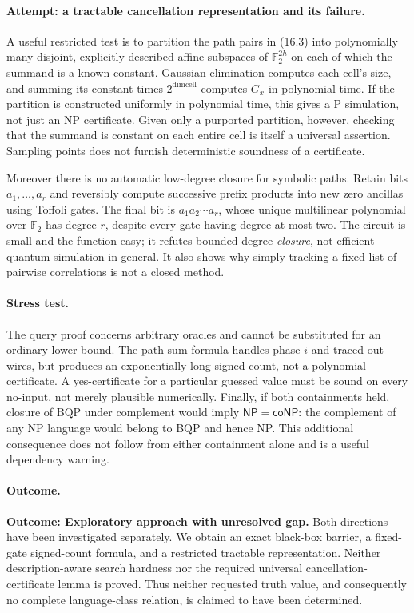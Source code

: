 \documentclass[11pt,a4paper]{article}
\newcommand{\F}{\mathbb{F}}
\begin{document}
\paragraph{Attempt: a tractable cancellation representation and its failure.}
A useful restricted test is to partition the path pairs in (16.3) into
polynomially many disjoint, explicitly described affine subspaces of
$\F_2^{2h}$ on each of which the summand is a known constant. Gaussian
elimination computes each cell's size, and summing its constant times
$2^{\dim\text{cell}}$ computes $G_x$ in polynomial time. If the partition
is constructed uniformly in polynomial time, this gives a P simulation,
not just an NP certificate. Given only a purported partition, however,
checking that the summand is constant on each entire cell is itself a
universal assertion. Sampling points does not furnish deterministic
soundness of a certificate.

Moreover there is no automatic low-degree closure for symbolic paths.
Retain bits $a_1,\ldots,a_r$ and reversibly compute successive prefix
products into new zero ancillas using Toffoli gates. The final bit is
$a_1a_2\cdots a_r$, whose unique multilinear polynomial over $\F_2$
has degree $r$, despite every gate having degree at most two. The circuit
is small and the function easy; it refutes bounded-degree \emph{closure},
not efficient quantum simulation in general. It also shows why simply
tracking a fixed list of pairwise correlations is not a closed method.

\paragraph{Stress test.}
The query proof concerns arbitrary oracles and cannot be substituted for
an ordinary lower bound. The path-sum formula handles phase-$i$ and
traced-out wires, but produces an exponentially long signed count, not a
polynomial certificate. A yes-certificate for a particular guessed value
must be sound on every no-input, not merely plausible numerically.
Finally, if both containments held, closure of BQP under complement would
imply $\mathsf{NP}=\mathsf{coNP}$: the complement of any NP language
would belong to BQP and hence NP. This additional consequence does not
follow from either containment alone and is a useful dependency warning.

\paragraph{Outcome.}
\textbf{Outcome: Exploratory approach with unresolved gap.}
Both directions have been investigated separately. We obtain an exact
black-box barrier, a fixed-gate signed-count formula, and a restricted
tractable representation. Neither description-aware search hardness nor
the required universal cancellation-certificate lemma is proved. Thus
neither requested truth value, and consequently no complete language-class
relation, is claimed to have been determined.
\end{document}
